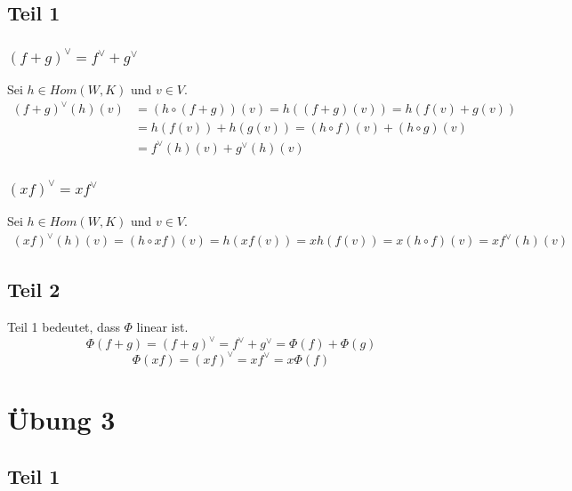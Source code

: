 \documentclass[a4paper,10pt]{article}
\begin{document}
\subsection*{Teil 1}

\subsubsection*{$(f + g)^\vee = f^\vee + g^\vee$}

Sei $h \in Hom(W, K)$ und $v \in V$.
\begin{align}
 (f + g)^\vee(h)(v) & = (h \circ (f + g))(v) = h((f + g)(v)) = h(f(v) + g(v))\\
 & = h(f(v)) + h(g(v)) = (h \circ f)(v) + (h \circ g)(v)\\
 & = f^\vee(h)(v) + g^\vee(h)(v)
\end{align}

\subsubsection*{$(xf)^\vee = xf^\vee$}

Sei $h \in Hom(W, K)$ und $v \in V$.
\begin{align}
 (xf)^\vee(h)(v) = (h \circ xf)(v) = h(xf(v)) = xh(f(v)) = x(h \circ f)(v) = xf^\vee(h)(v)
\end{align}

\subsection*{Teil 2}

Teil 1 bedeutet, dass $\Phi$ linear ist.
\begin{equation}
 \Phi(f + g) = (f + g)^\vee = f^\vee + g^\vee = \Phi(f) + \Phi(g)
\end{equation}
\begin{equation}
 \Phi(xf) = (xf)^\vee = xf^\vee = x\Phi(f)
\end{equation}

\section*{Übung 3}

\subsection*{Teil 1}
\end{document}
